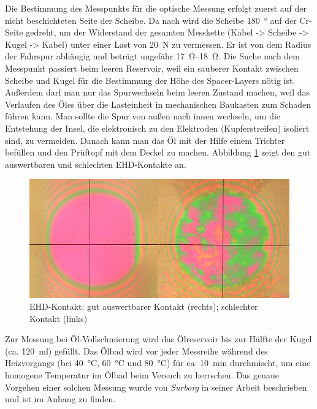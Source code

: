 Die Bestimmung des Messpunkts für die optische Messung erfolgt zuerst auf der nicht beschichteten Seite der Scheibe.
Da nach wird die Scheibe \SI{180}{\degree} auf der Cr-Seite gedreht, um der Widerstand der gesamten Messkette (Kabel -> Scheibe -> Kugel -> Kabel) unter einer Last von \SI{20}{\newton} zu vermessen.
Er ist von dem Radius der Fahrspur abhängig und beträgt ungefähr \SIrange{17}{18}{\ohm}.
Die Suche nach dem Messpunkt passiert beim leeren Reservoir, weil ein sauberer Kontakt zwischen Scheibe und Kugel für die Bestimmung der Höhe des Spacer-Layers nötig ist.
Außerdem darf man nur das Spurwechseln beim leeren Zustand machen, weil das Verlaufen des Öles über die Lasteinheit in mechanischen Baukasten zum Schaden führen kann.
Man sollte die Spur von außen nach innen wechseln, um die Entstehung der Insel, die elektronisch zu den Elektroden (Kupferstreifen) isoliert sind, zu vermeiden.
Danach kann man das Öl mit der Hilfe einem Trichter befüllen und den Prüftopf mit dem Deckel zu machen.
Abbildung \ref{fig:ehd_kontakt} zeigt den gut auswertbaren und schlechten EHD-Kontakte an.
\begin{figure}[htb]
    \centering
    \includegraphics[width=0.8\linewidth]{./images/ehd_kontakt.jpg}
    \caption{EHD-Kontakt: gut auswertbarer Kontakt (rechts); schlechter Kontakt (links)}
    \label{fig:ehd_kontakt}
\end{figure}

Zur Messung bei Öl-Vollschmierung wird das Ölreservoir bis zur Hälfte der Kugel (ca. \SI{120}{\ml}) gefüllt.
Das Ölbad wird vor jeder Messreihe während des Heizvorgangs (bei \SI{40}{\degreeCelsius}, \SI{60}{\degreeCelsius} und \SI{80}{\degreeCelsius}) für ca. \SI{10}{\minute} durchmischt, um eine homogene Temperatur im Ölbad beim Versuch zu herrschen.
Das genaue Vorgehen einer solchen Messung wurde von \textit{Surborg} in seiner Arbeit \cite{surborg_2007} beschrieben und ist im Anhang zu finden.

